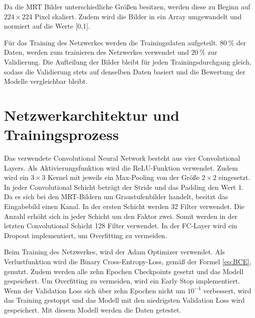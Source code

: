 Da die MRT Bilder unterschiedliche Größen besitzen, werden diese zu Beginn auf $224 \times 224$ Pixel skaliert.
Zudem wird die Bilder in ein Array umgewandelt und normiert auf die Werte [0,1].

Für das Training des Netzwerkes werden die Trainingsdaten aufgeteilt. $\qty{80}{\%}$ der Daten, werden zum trainieren des Netzwerkes 
verwendet und $\qty{20}{\%}$ zur Validierung.
Die Aufteilung der Bilder bleibt für jeden Trainingsdurchgang gleich, sodass die Validierung stets auf denselben Daten basiert und die Bewertung der Modelle vergleichbar bleibt.

\section{Netzwerkarchitektur und Trainingsprozess}
Das verwendete Convolutional Neural Network besteht aus vier Convolutional Layers. Als Aktivierungsfunktion wird die ReLU-Funktion verwendet.
Zudem wird ein $3 \times 3$ Kernel mit jeweils ein Max-Pooling von der Größe $2 \times 2$ eingesetzt. 
In jeder Convolutional Schicht beträgt der Stride und das Padding den Wert 1.
Da es sich bei den MRT-Bildern um Graustufenbilder handelt, besitzt das Eingabebild einen Kanal. 
In der ersten Schicht werden 32 Filter verwendet.
Die Anzahl erhöht sich in jeder Schicht um den Faktor zwei.
Somit werden in der letzten Convolutional Schicht 128 Filter verwendet.
In der FC-Layer wird ein Dropout implementiert, um Overfitting zu vermeiden.

Beim Training des Netzwerkes, wird der Adam Optimizer verwendet. 
Als Verlustfunktion wird die Binary Cross-Entropy-Loss, gemäß der Formel \ref{eq:BCE}, genutzt.
Zudem werden alle zehn Epochen Checkpoints gesetzt und das Modell gespeichert.
Um Overfitting zu vermeiden, wird ein Early Stop implementiert. Wenn der Validation Loss sich über zehn Epochen nicht um $10^{-4}$
verbessert, wird das Training gestoppt und das Modell mit den niedrigsten Validation Loss wird gespeichert.
Mit diesem Modell werden die Daten getestet.


